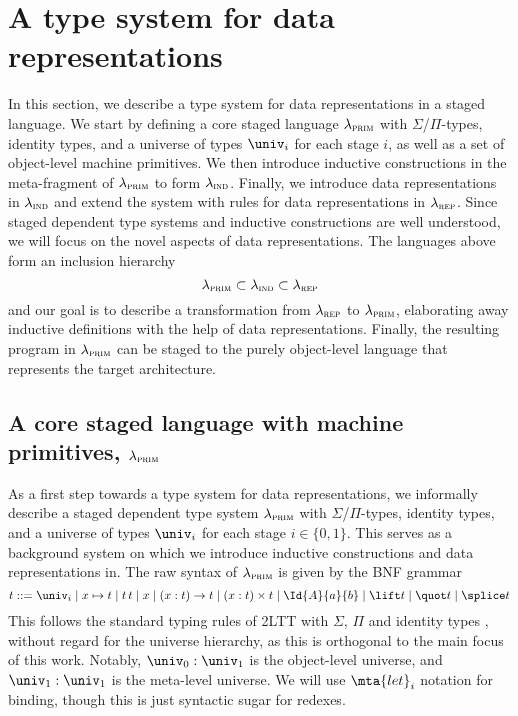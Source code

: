 \newcommand{\lambdaprim}{\lambda_{\textsc{prim}}}
\newcommand{\lambdaind}{\lambda_{\textsc{ind}}}
\newcommand{\lambdarep}{\lambda_{\textsc{rep}}}

\section{A type system for data representations}\label{sec:type-system}

In this section, we describe a type system for data representations in a staged
language. We start by defining a core staged language $\lambdaprim$ with
$\Sigma$/$\Pi$-types, identity types, and a universe of types $\univ_i$ for
each stage $i$, as well as a set of object-level machine primitives. We then
introduce inductive constructions in the meta-fragment of $\lambdaprim$ to form
$\lambdaind$. Finally, we introduce data representations in $\lambdaind$ and
extend the system with rules for data representations in $\lambdarep$. Since
staged dependent type systems and inductive constructions are well understood,
we will focus on the novel aspects of data representations. The languages above
form an inclusion hierarchy
\[
  \lambdaprim \subset \lambdaind \subset \lambdarep
\]
and our goal is to describe a transformation from $\lambdarep$ to
$\lambdaprim$, elaborating away inductive definitions with the help of data
representations. Finally, the resulting program in $\lambdaprim$ can be staged
to the purely object-level language that represents the target architecture.

\subsection{A core staged language with machine primitives, $\lambdaprim$}
\newcommand{\seq}[2]{[#1; #2]}

As a first step towards a type system for data representations, we informally
describe a staged dependent type system $\lambdaprim$ with
$\Sigma$/$\Pi$-types, identity types, and a universe of types $\univ_i$ for
each stage $i \in \{0, 1\}$. This serves as a background system on which we
introduce inductive constructions and data representations in. The raw syntax
of $\lambdaprim$ is given by the BNF grammar
\[
  t ::= \univ_i \mid x \mapsto t \mid t \, t \mid x \mid (x : t) \to t \mid (x : t) \times t \mid
  \Id{A}{a}{b} \mid \lift t \mid \quot t \mid \splice t
\]
This follows the standard typing rules of 2LTT with $\Sigma$, $\Pi$ and
identity types \cite{Kovacs2022-vb}, without regard for the universe hierarchy,
as this is orthogonal to the main focus of this work. Notably, $\univ_0 :
  \univ_1$ is the object-level universe, and $\univ_1 : \univ_1$ is the
meta-level universe. We will use $\mta{let}_i$ notation for binding, though
this is just syntactic sugar for redexes.

